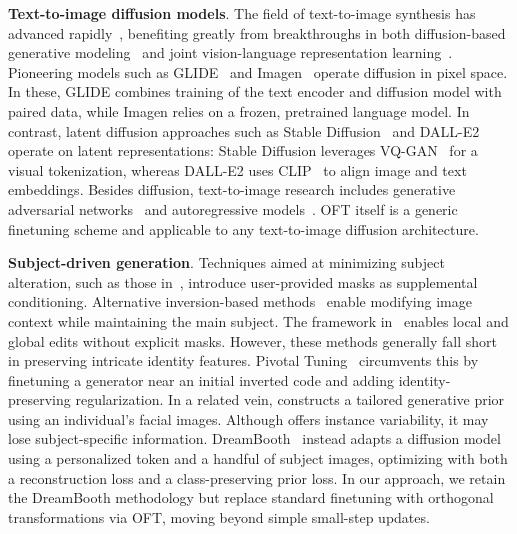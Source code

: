 \textbf{Text-to-image diffusion models}. The field of text-to-image synthesis has advanced rapidly~\cite{saharia2022photorealistic,ramesh2022hierarchical,rombach2022high,gu2022vector,nichol2022glide}, benefiting greatly from breakthroughs in both diffusion-based generative modeling~\cite{ho2020denoising,song2021score,song2021denoising,dhariwal2021diffusion} and joint vision-language representation learning~\cite{su2020vlbert,lu2019vilbert,radford2021learning,wang2021simvlm,li2022blip,li2023blip,alayrac2022flamingo,schuhmann2022laion}. Pioneering models such as GLIDE~\cite{nichol2022glide} and Imagen~\cite{saharia2022photorealistic} operate diffusion in pixel space. In these, GLIDE combines training of the text encoder and diffusion model with paired data, while Imagen relies on a frozen, pretrained language model. In contrast, latent diffusion approaches such as Stable Diffusion~\cite{rombach2022high} and DALL-E2~\cite{ramesh2022hierarchical} operate on latent representations: Stable Diffusion leverages VQ-GAN~\cite{esser2021taming} for a visual tokenization, whereas DALL-E2 uses CLIP~\cite{radford2021learning} to align image and text embeddings. Besides diffusion, text-to-image research includes generative adversarial networks~\cite{reed2016generative,zhang2017stackgan,xu2018attngan,li2019controllable} and autoregressive models~\cite{ramesh2021zero,ding2021cogview,wu2022nuwa,yuscaling}. OFT itself is a generic finetuning scheme and applicable to any text-to-image diffusion architecture.

\textbf{Subject-driven generation}. Techniques aimed at minimizing subject alteration, such as those in~\cite{avrahami2022blended,nichol2022glide}, introduce user-provided masks as supplemental conditioning. Alternative inversion-based methods~\cite{choi2021ilvr,dhariwal2021diffusion,ramesh2022hierarchical,gal2022image} enable modifying image context while maintaining the main subject. The framework in~\cite{hertz2022prompt} enables local and global edits without explicit masks. However, these methods generally fall short in preserving intricate identity features. Pivotal Tuning~\cite{roich2022pivotal} circumvents this by finetuning a generator near an initial inverted code and adding identity-preserving regularization. In a related vein, \cite{nitzan2022mystyle} constructs a tailored generative prior using an individual's facial images. Although \cite{casanova2021instance} offers instance variability, it may lose subject-specific information. DreamBooth~\cite{ruiz2023dreambooth} instead adapts a diffusion model using a personalized token and a handful of subject images, optimizing with both a reconstruction loss and a class-preserving prior loss. In our approach, we retain the DreamBooth methodology but replace standard finetuning with orthogonal transformations via OFT, moving beyond simple small-step updates.

